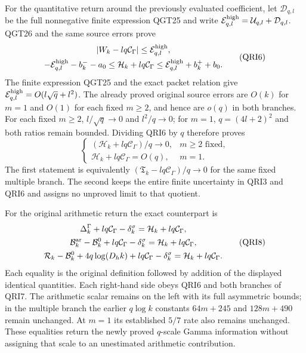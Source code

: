 For the quantitative return around the previously evaluated coefficient,
let $\mathcal D_{q,l}$ be the full nonnegative finite expression QGT25
and write $\mathcal E_{q,l}^{\rm high}=\mathcal U_{q,l}+\mathcal D_{q,l}$.
QGT26 and the same source errors prove
\[
\begin{gathered}
 |W_k-lq\mathcal C_\Gamma|\le\mathcal E_{q,l}^{\rm high},\\
 -\mathcal E_{q,l}^{\rm high}-b_k^--a_0
 \le \mathcal H_k+lq\mathcal C_\Gamma
 \le \mathcal E_{q,l}^{\rm high}+b_k^++b_0.
\end{gathered}\tag{QRI6}
\]
The finite expression QGT25 and the exact packet relation give
$\mathcal E_{q,l}^{\rm high}=O(l\sqrt q+l^2)$.
The already proved original source errors are $O(k)$ for $m=1$
and $O(1)$ for each fixed $m\ge2$, and hence are $o(q)$ in both
branches. For each fixed $m\ge2$, $l/\sqrt q\to0$ and
$l^2/q\to0$; for $m=1$, $q=(4l+2)^2$ and both ratios remain
bounded. Dividing QRI6 by $q$ therefore proves
\[
 \begin{cases}
 (\mathcal H_k+lq\mathcal C_\Gamma)/q\longrightarrow0,
                   &m\ge2\text{ fixed},\\
 \mathcal H_k+lq\mathcal C_\Gamma=O(q),&m=1.
 \end{cases}
 \tag{QRI7}
\]
The first statement is equivalently
$(\mathfrak T_k-lq\mathcal C_\Gamma)/q\to0$ for the same fixed
multiple branch. The second keeps the entire finite uncertainty
in QRI3 and QRI6 and assigns no unproved limit to that quotient.

For the original arithmetic return the exact counterpart is
\[
\begin{gathered}
 \Delta_k^\Gamma+lq\mathcal C_\Gamma-\delta_k^\sigma
       =\mathcal H_k+lq\mathcal C_\Gamma,\\
 \mathcal B_k^{\rm ar}-\mathcal B_k^0+lq\mathcal C_\Gamma
       -\delta_k^\sigma=\mathcal H_k+lq\mathcal C_\Gamma,\\
 \mathcal R_k-\mathcal B_k^0+4q\log(D_hk)
       +lq\mathcal C_\Gamma-\delta_k^\sigma
       =\mathcal H_k+lq\mathcal C_\Gamma.
\end{gathered}\tag{QRI8}
\]
Each equality is the original definition followed by addition of
the displayed identical quantities. Each right-hand side obeys
QRI6 and both branches of QRI7. The arithmetic scalar remains
on the left with its full asymmetric bounds; in the multiple
branch the earlier $q\log k$ constants $64m+245$ and $128m+490$
remain unchanged. At $m=1$ its established $5/7$ rate also
remains unchanged. These equalities return the newly proved
$q$-scale Gamma information without assigning that scale to an
unestimated arithmetic contribution.

